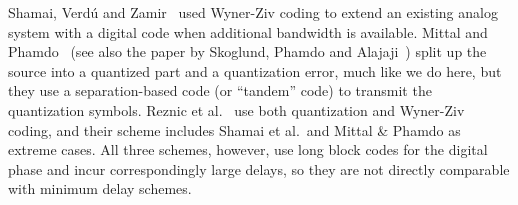 Shamai, Verd\'u and Zamir~\cite{ShamaiVZ1998} used Wyner-Ziv coding to extend an
existing analog system with a digital code when additional bandwidth is
available. Mittal and Phamdo~\cite{MittalP2002} (see also the paper by Skoglund,
Phamdo and Alajaji~\cite{SkoglundPA2002}) split up the source into a quantized
part and a quantization error, much like we do here, but they use a
separation-based code (or ``tandem'' code) to transmit the quantization symbols.
Reznic et al.~\cite{ReznicFZ2006} use both quantization and Wyner-Ziv coding,
and their scheme includes Shamai et al.\ and Mittal \& Phamdo as extreme cases.
All three schemes, however, use long block codes for the digital phase and incur
correspondingly large delays, so they are not directly comparable with minimum
delay schemes.
















